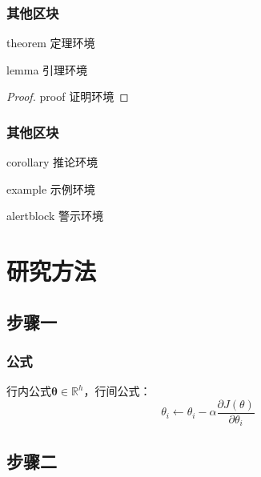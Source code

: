 \documentclass[AutoFakeBold,AutoFakeSlant]{beamer}
\begin{document}
\begin{frame}
  \frametitle{其他区块}

  \begin{theorem}{theorem 定理环境}

  \end{theorem}

  \begin{lemma}{lemma 引理环境}
    
  \end{lemma}

  \begin{proof}{proof 证明环境}
    
  \end{proof}
\end{frame}

\begin{frame}
  \frametitle{其他区块}

  \begin{corollary}{corollary 推论环境}
    
  \end{corollary}

  \begin{example}{example 示例环境}
    
  \end{example}

  \begin{alertblock}{alertblock 警示环境}

  \end{alertblock}
\end{frame}

\section{研究方法}

\subsection{步骤一}

\begin{frame}
  \frametitle{公式}
  行内公式$\boldsymbol{\theta}\in\mathbb{R}^{h}$，行间公式：
  \begin{equation}
    \theta_{i}\leftarrow\theta_{i}-\alpha\frac{\partial J(\theta)}{\partial\theta_{i}}
  \label{equ}
  \end{equation}
\end{frame}

\subsection{步骤二}
\end{document}
